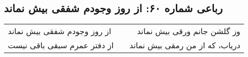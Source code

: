 \begin{center}
\section*{رباعی شماره ۶۰: از روز وجودم شفقی بیش نماند}
\label{sec:060}
\begin{longtable}{l p{0.5cm} r}
از روز وجودم شفقی بیش نماند
&&
وز گلشن جانم ورقی بیش نماند
\\
از دفتر عمرم سبقی باقی نیست
&&
دریاب، که از من رمقی بیش نماند
\\
\end{longtable}
\end{center}
